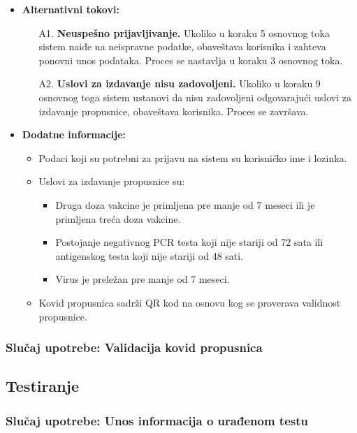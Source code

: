 \documentclass[titlepage]{article}
\begin{document}
\begin{itemize}
    
    \item \textbf{Alternativni tokovi:}
        \begin{itemize}
            \item[A1.] \textbf{Neuspešno prijavljivanje.} Ukoliko u koraku 5 osnovnog toka sistem naiđe na neispravne podatke, obaveštava korisnika i zahteva ponovni unos podataka. Proces se nastavlja u koraku 3 osnovnog toka.
            \item[A2.] \textbf{Uslovi za izdavanje nisu zadovoljeni.} Ukoliko u koraku 9 osnovnog toga sistem ustanovi da nisu zadovoljeni odgovarajući uslovi za izdavanje propusnice, obaveštava korisnika. Proces se završava.
        \end{itemize}
    
        
    \item \textbf{Dodatne informacije:}
        \begin{itemize}
            \item Podaci koji su potrebni za prijavu na sistem su korisničko ime i lozinka.
            \item Uslovi za izdavanje propusnice su:
                \begin{itemize}
                    \item Druga doza vakcine je primljena pre manje od 7 meseci ili  je primljena treća doza vakcine.
                    \item Postojanje negativnog PCR testa koji nije stariji od 72 sata ili antigenskog testa koji nije stariji od 48 sati.
                    \item Virus je preležan pre manje od 7 meseci.
                \end{itemize}
            \item Kovid propusnica sadrži QR kod na osnovu kog se proverava validnost propusnice.
        \end{itemize}
\end{itemize}

\subsubsection{Slučaj upotrebe: Validacija kovid propusnica}

\subsection{Testiranje}

\subsubsection{Slučaj upotrebe: Unos informacija o urađenom testu}
\end{document}
